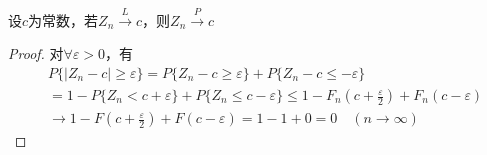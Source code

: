 \begin{theorem}
    设$c$为常数，若$Z_n\xrightarrow{L}c$，则$Z_n\xrightarrow{P}c$
\end{theorem}
\begin{proof}
    对$\forall \varepsilon >0$，有
    \[
        \begin{aligned}
            &P\{\bigl|Z_{n}-c\bigr|\geqslant\varepsilon\}=P\{Z_{n}-c\geq\varepsilon\}+P\{Z_{n}-c\leq-\varepsilon\} \\
            &=1-P\{Z_{n}<c+\varepsilon\}+P\{Z_{n}\leq c-\varepsilon\}\leq1-F_{n}(c+\frac{\varepsilon}{2})+F_{n}(c-\varepsilon) \\
            &\rightarrow1-F(c+\frac{\varepsilon}{2})+F(c-\varepsilon)=1-1+0=0\quad(n\rightarrow\infty)
        \end{aligned}      
    \]
\end{proof}

